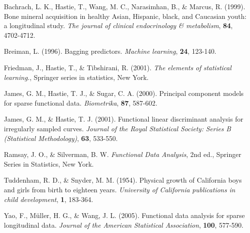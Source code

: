 \documentclass[eng]{csam}
\begin{document}
\begin{reference}
	\item[] Bachrach, L. K., Hastie, T., Wang, M. C., Narasimhan, B., \& Marcus, R. (1999). Bone mineral acquisition in healthy Asian, Hispanic, black, and Caucasian youth: a longitudinal study. {\em The journal of clinical endocrinology \& metabolism}, {\bf 84}, 4702-4712.
	\item[] Breiman, L. (1996). Bagging predictors. {\em Machine learning}, {\bf 24}, 123-140.
	\item[] Friedman, J., Hastie, T., \& Tibshirani, R. (2001). {\em The elements of statistical learning.}, Springer series in statistics, New York.
	\item[] James, G. M., Hastie, T. J., \& Sugar, C. A. (2000). Principal component models for sparse functional data. {\em Biometrika}, {\bf 87}, 587-602.
	\item[] James, G. M., \& Hastie, T. J. (2001). Functional linear discriminant analysis for irregularly sampled curves. {\em Journal of the Royal Statistical Society: Series B (Statistical Methodology)}, {\bf 63}, 533-550.
	\item[] Ramsay, J. O., \& Silverman, B. W. {\em Functional Data Analysis}, 2nd ed., Springer Series in Statistics, New York.
	\item[] Tuddenham, R. D., \& Snyder, M. M. (1954). Physical growth of California boys and girls from birth to eighteen years. {\em University of California publications in child development}, {\bf 1}, 183-364.
	\item[] Yao, F., Müller, H. G., \& Wang, J. L. (2005). Functional data analysis for sparse longitudinal data. {\em Journal of the American Statistical Association}, {\bf 100}, 577-590.
\end{reference}

%
%
\end{document}
